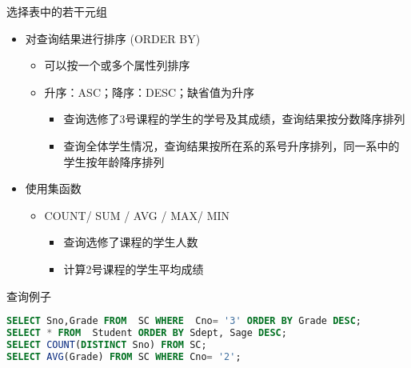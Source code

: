 \begin{frame}[fragile]{选择表中的若干元组}
\begin{itemize}
    \item 对查询结果进行排序  (ORDER BY) 
    \begin{itemize}
        \item 可以按一个或多个属性列排序
        \item 升序：ASC；降序：DESC；缺省值为升序
        \begin{itemize}
        \item 查询选修了3号课程的学生的学号及其成绩，查询结果按分数降序排列
        \item 查询全体学生情况，查询结果按所在系的系号升序排列，同一系中的学生按年龄降序排列
        \end{itemize}
    \end{itemize}
    \item 使用集函数
    \begin{itemize}
        \item COUNT/ SUM / AVG / MAX/ MIN
        \begin{itemize}
            \item 查询选修了课程的学生人数
            \item 计算2号课程的学生平均成绩
        \end{itemize}
    \end{itemize}
    
\end{itemize}

\begin{block}{查询例子}
\begin{lstlisting}[language=SQL]
SELECT Sno,Grade FROM  SC WHERE  Cno= '3' ORDER BY Grade DESC;
SELECT * FROM  Student ORDER BY Sdept, Sage DESC; 
SELECT COUNT(DISTINCT Sno) FROM SC;
SELECT AVG(Grade) FROM SC WHERE Cno= '2';


\end{lstlisting}
\end{block}
\end{frame}




